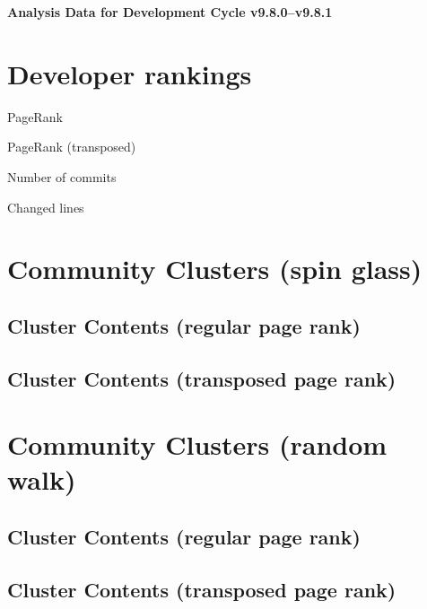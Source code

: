 \documentclass{article}
\begin{document}
\setlength{\parindent}{0pt}
\begin{center}
\begin{Large}
\textbf{Analysis Data for Development Cycle v9.8.0--v9.8.1}
\end{Large}
\end{center}
\section{Developer rankings}
\begin{small}\renewcommand{\tabcolsep}{1pt}
\begin{minipage}{0.5\linewidth}
PageRank\\

\end{minipage}%
\begin{minipage}{0.5\linewidth}
PageRank (transposed)\\

\end{minipage}

\renewcommand{\tabcolsep}{5pt}
\begin{minipage}{0.5\linewidth}
Number of commits\\

\end{minipage}%
\begin{minipage}{0.5\linewidth}
Changed lines\\

\end{minipage}
\end{small}
\newpage\section{Community Clusters (spin glass)}
\subsection{Cluster Contents (regular page rank)}
\newpage\subsection{Cluster Contents (transposed page rank)}
\newpage\section{Community Clusters (random walk)}
\subsection{Cluster Contents (regular page rank)}
\newpage\subsection{Cluster Contents (transposed page rank)}
\end{document}
